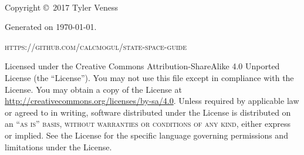 \begingroup
\thispagestyle{empty}
\vfill
\endgroup

\newpage
~\vfill
\thispagestyle{empty}

Copyright \copyright\ 2017 Tyler Veness

Generated on \monthdayyeardate\today.

\textsc{https://github.com/calcmogul/state-space-guide}

Licensed under the Creative Commons Attribution-ShareAlike 4.0 Unported License
(the ``License''). You may not use this file except in compliance with the
License. You may obtain a copy of the License at
\url{http://creativecommons.org/licenses/by-sa/4.0}. Unless required by
applicable law or agreed to in writing, software distributed under the License
is distributed on an \textsc{``as is'' basis, without warranties or conditions
of any kind}, either express or implied. See the License for the specific
language governing permissions and limitations under the License.



\pagestyle{empty} %

\tableofcontents %

\cleardoublepage

\pagestyle{fancy} %
